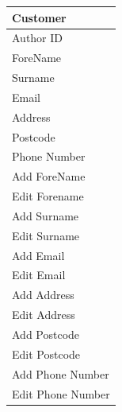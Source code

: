 \begin{tabular}{|p{4cm}|}
    \hline
    \textbf{Customer} \\ \hline
    Author ID \\ ForeName \\ Surname \\ Email \\ Address \\ Postcode \\ Phone Number \\ \hline
    Add ForeName \\ Edit Forename \\ Add Surname \\ Edit Surname \\ Add Email \\ Edit Email \\ Add Address \\ Edit Address \\ Add Postcode \\ Edit Postcode \\ Add Phone Number \\ Edit Phone Number \\ \hline
    \hline
\end{tabular}

